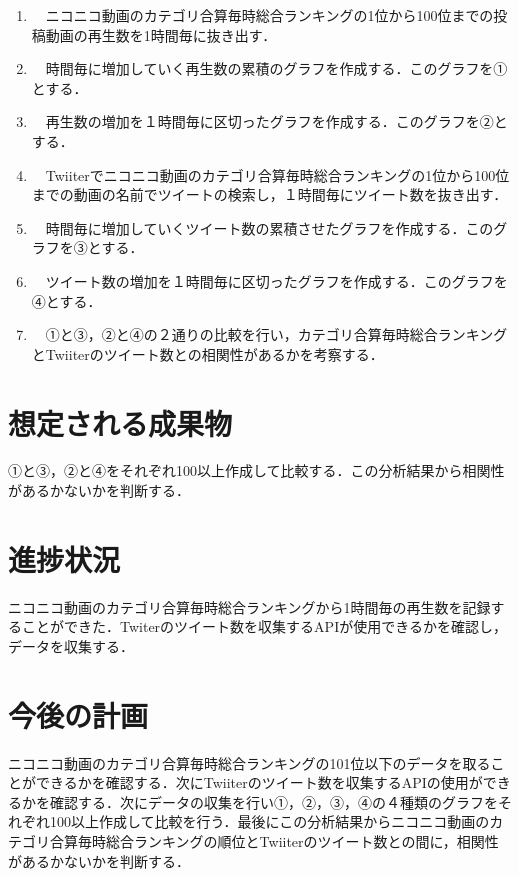 \documentclass[uplatex,twocolumn,dvipdfmx]{jsarticle}
\begin{document}
\begin{enumerate}

\item　ニコニコ動画のカテゴリ合算毎時総合ランキングの1位から100位までの投稿動画の再生数を1時間毎に抜き出す．
\item　時間毎に増加していく再生数の累積のグラフを作成する．このグラフを①とする．
\item　再生数の増加を１時間毎に区切ったグラフを作成する．このグラフを②とする．
\item　Twiiterでニコニコ動画のカテゴリ合算毎時総合ランキングの1位から100位までの動画の名前でツイートの検索し，１時間毎にツイート数を抜き出す．
\item　時間毎に増加していくツイート数の累積させたグラフを作成する．このグラフを③とする．
\item　ツイート数の増加を１時間毎に区切ったグラフを作成する．このグラフを④とする．
\item　①と③，②と④の２通りの比較を行い，カテゴリ合算毎時総合ランキングとTwiiterのツイート数との相関性があるかを考察する．

\end{enumerate}

\section{想定される成果物}
①と③，②と④をそれぞれ100以上作成して比較する．この分析結果から相関性があるかないかを判断する．

\section{進捗状況}
ニコニコ動画のカテゴリ合算毎時総合ランキングから1時間毎の再生数を記録することができた．Twiterのツイート数を収集するAPIが使用できるかを確認し，データを収集する．

\section{今後の計画}
ニコニコ動画のカテゴリ合算毎時総合ランキングの101位以下のデータを取ることができるかを確認する．次にTwiiterのツイート数を収集するAPIの使用ができるかを確認する．次にデータの収集を行い①，②，③，④の４種類のグラフをそれぞれ100以上作成して比較を行う．最後にこの分析結果からニコニコ動画のカテゴリ合算毎時総合ランキングの順位とTwiiterのツイート数との間に，相関性があるかないかを判断する．



\end{document}
